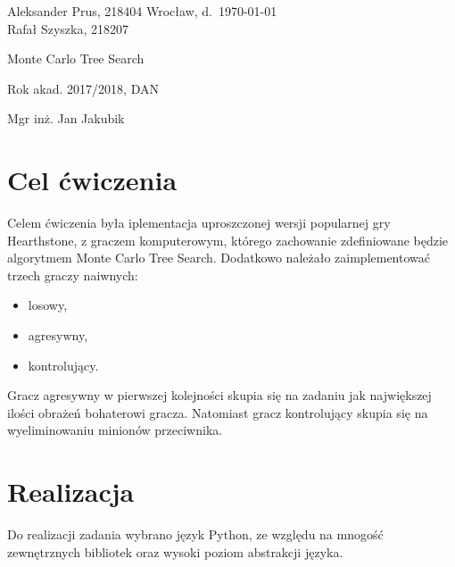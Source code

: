 \documentclass[a4paper, 12pt]{article}
\begin{document}
\thispagestyle{empty}
\noindent Aleksander Prus, 218404 \hfill Wrocław, d.\ \today
\\ Rafał Szyszka, 218207

\vfill

\begin{center}
    \begin{Huge}
        Monte Carlo Tree Search\\
    \end{Huge}
\end{center}

\begin{center}
    Rok akad. 2017/2018, DAN
\end{center}

\vspace{0.2ex}

\begin{flushright}
    \begin{minipage}[t]{0.4\columnwidth}
        \noindent Mgr inż. Jan Jakubik
    \end{minipage}
\end{flushright}

\vfill
\newpage
\tableofcontents
\newpage
\section*{Cel ćwiczenia}
Celem ćwiczenia była iplementacja uproszczonej wersji popularnej gry Hearthstone, z graczem komputerowym, którego zachowanie zdefiniowane będzie algorytmem Monte Carlo Tree Search. Dodatkowo należało zaimplementować trzech graczy naiwnych:
\begin{itemize}
\item losowy,
\item agresywny,
\item kontrolujący.
\end{itemize}

Gracz agresywny w pierwszej kolejności skupia się na zadaniu jak największej ilości obrażeń bohaterowi gracza. Natomiast gracz kontrolujący skupia się na wyeliminowaniu minionów przeciwnika.


\section*{Realizacja}
Do realizacji zadania wybrano język Python, ze względu na mnogość zewnętrznych bibliotek oraz wysoki poziom abstrakcji języka.
\end{document}
